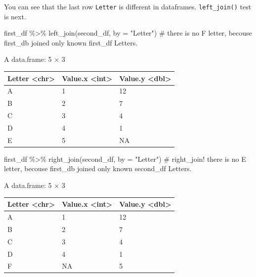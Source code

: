 \documentclass[
  letterpaper,
  DIV=11,
  numbers=noendperiod]{scrreprt}
\newenvironment{Shaded}{\begin{snugshade}}{\end{snugshade}}
\newcommand{\AttributeTok}[1]{\textcolor[rgb]{0.40,0.45,0.13}{#1}}
\newcommand{\CommentTok}[1]{\textcolor[rgb]{0.37,0.37,0.37}{#1}}
\newcommand{\FunctionTok}[1]{\textcolor[rgb]{0.28,0.35,0.67}{#1}}
\newcommand{\NormalTok}[1]{\textcolor[rgb]{0.00,0.23,0.31}{#1}}
\newcommand{\SpecialCharTok}[1]{\textcolor[rgb]{0.37,0.37,0.37}{#1}}
\newcommand{\StringTok}[1]{\textcolor[rgb]{0.13,0.47,0.30}{#1}}
\begin{document}
You can see that the last row \texttt{Letter} is different in
dataframes. \texttt{left\_join()} test is next.

\begin{Shaded}
\begin{Highlighting}[]
\NormalTok{first\_df }\SpecialCharTok{\%\textgreater{}\%} 
    \FunctionTok{left\_join}\NormalTok{(second\_df, }\AttributeTok{by =} \StringTok{"Letter"}\NormalTok{)}
\CommentTok{\# there is no F letter, becouse first\_db joined only known first\_df Letters.}
\end{Highlighting}
\end{Shaded}

A data.frame: 5 × 3

\begin{longtable}[]{@{}lll@{}}
\toprule\noalign{}
Letter \textless chr\textgreater{} & Value.x \textless int\textgreater{}
& Value.y \textless dbl\textgreater{} \\
\midrule\noalign{}
\endhead
\bottomrule\noalign{}
\endlastfoot
A & 1 & 12 \\
B & 2 & 7 \\
C & 3 & 4 \\
D & 4 & 1 \\
E & 5 & NA \\
\end{longtable}

\begin{Shaded}
\begin{Highlighting}[]
\NormalTok{first\_df }\SpecialCharTok{\%\textgreater{}\%} 
    \FunctionTok{right\_join}\NormalTok{(second\_df, }\AttributeTok{by =} \StringTok{"Letter"}\NormalTok{)}
\CommentTok{\# right\_join! there is no E letter, becouse first\_db joined only known second\_df Letters.}
\end{Highlighting}
\end{Shaded}

A data.frame: 5 × 3

\begin{longtable}[]{@{}lll@{}}
\toprule\noalign{}
Letter \textless chr\textgreater{} & Value.x \textless int\textgreater{}
& Value.y \textless dbl\textgreater{} \\
\midrule\noalign{}
\endhead
\bottomrule\noalign{}
\endlastfoot
A & 1 & 12 \\
B & 2 & 7 \\
C & 3 & 4 \\
D & 4 & 1 \\
F & NA & 5 \\
\end{longtable}
\end{document}
